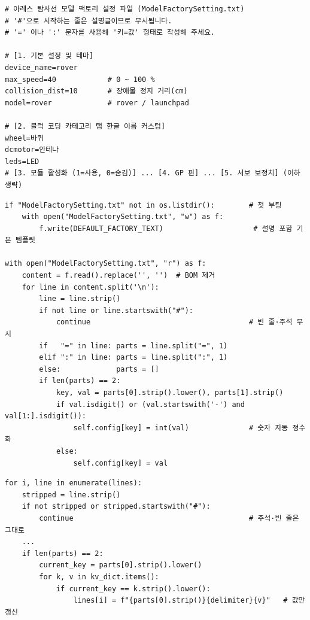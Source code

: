 \begin{verbatim}
# 아레스 탐사선 모델 팩토리 설정 파일 (ModelFactorySetting.txt)
# '#'으로 시작하는 줄은 설명글이므로 무시됩니다.
# '=' 이나 ':' 문자를 사용해 '키=값' 형태로 작성해 주세요.

# [1. 기본 설정 및 테마]
device_name=rover
max_speed=40            # 0 ~ 100 %
collision_dist=10       # 장애물 정지 거리(cm)
model=rover             # rover / launchpad

# [2. 블럭 코딩 카테고리 탭 한글 이름 커스텀]
wheel=바퀴
dcmotor=안테나
leds=LED
# [3. 모듈 활성화 (1=사용, 0=숨김)] ... [4. GP 핀] ... [5. 서보 보정치] (이하 생략)
\end{verbatim}

\begin{verbatim}
if "ModelFactorySetting.txt" not in os.listdir():        # 첫 부팅
    with open("ModelFactorySetting.txt", "w") as f:
        f.write(DEFAULT_FACTORY_TEXT)                     # 설명 포함 기본 템플릿

with open("ModelFactorySetting.txt", "r") as f:
    content = f.read().replace('﻿', '')  # BOM 제거
    for line in content.split('\n'):
        line = line.strip()
        if not line or line.startswith("#"):
            continue                                     # 빈 줄·주석 무시
        if   "=" in line: parts = line.split("=", 1)
        elif ":" in line: parts = line.split(":", 1)
        else:             parts = []
        if len(parts) == 2:
            key, val = parts[0].strip().lower(), parts[1].strip()
            if val.isdigit() or (val.startswith('-') and val[1:].isdigit()):
                self.config[key] = int(val)              # 숫자 자동 정수화
            else:
                self.config[key] = val
\end{verbatim}

\begin{verbatim}
for i, line in enumerate(lines):
    stripped = line.strip()
    if not stripped or stripped.startswith("#"):
        continue                                         # 주석·빈 줄은 그대로
    ...
    if len(parts) == 2:
        current_key = parts[0].strip().lower()
        for k, v in kv_dict.items():
            if current_key == k.strip().lower():
                lines[i] = f"{parts[0].strip()}{delimiter}{v}"   # 값만 갱신
\end{verbatim}

